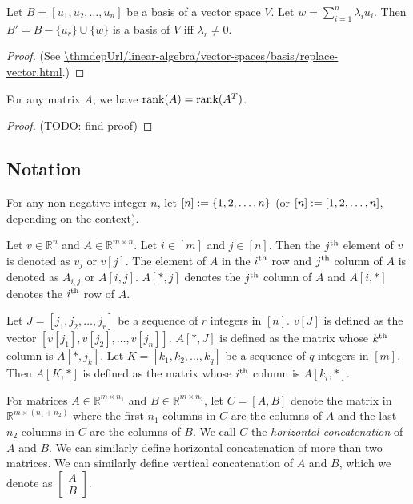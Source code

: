 \begin{lemma}
\label{thm:replace-vector-in-basis}
Let $B = [u_1, u_2, \ldots, u_n]$ be a basis of a vector space $V$.
Let $w = \sum_{i=1}^n \lambda_i u_i$.
Then $B' = B - \{u_r\} \cup \{w\}$ is a basis of $V$ iff $\lambda_r \neq 0$.
\end{lemma}
\begin{proof}
(See \url{\thmdepUrl/linear-algebra/vector-spaces/basis/replace-vector.html}.)
\end{proof}

\begin{lemma}
For any matrix $A$, we have $\operatorname{rank}(A) = \operatorname{rank}(A^T)$.
\end{lemma}
\begin{proof}
(TODO: find proof)
\end{proof}

\subsection{Notation}

For any non-negative integer $n$, let $[n] := \{1, 2, \ldots, n\}$
(or $[n] := [1, 2, \ldots, n]$, depending on the context).

Let $v \in \mathbb{R}^n$ and $A \in \mathbb{R}^{m \times n}$.
Let $i \in [m]$ and $j \in [n]$.
Then the $j^{\textrm{th}}$ element of $v$ is denoted as $v_j$ or $v[j]$.
The element of $A$ in the $i^{\textrm{th}}$ row and $j^{\textrm{th}}$ column of $A$ is denoted as
$A_{i,j}$ or $A[i,j]$. $A[*,j]$ denotes the $j^{\textrm{th}}$ column of $A$ and
$A[i, *]$ denotes the $i^{\textrm{th}}$ row of $A$.

Let $J = [j_1, j_2, \ldots, j_r]$ be a sequence of $r$ integers in $[n]$.
$v[J]$ is defined as the vector $[v[j_1], v[j_2], \ldots, v[j_n]]$.
$A[*,J]$ is defined as the matrix whose $k^{\textrm{th}}$ column is $A[*,j_k]$.
Let $K = [k_1, k_2, \ldots, k_q]$ be a sequence of $q$ integers in $[m]$.
Then $A[K,*]$ is defined as the matrix whose $i^{\textrm{th}}$ column is $A[k_i,*]$.

For matrices $A \in \mathbb{R}^{m \times n_1}$ and $B \in \mathbb{R}^{m \times n_2}$,
let $C = [A, B]$ denote the matrix in $\mathbb{R}^{m \times (n_1 + n_2)}$
where the first $n_1$ columns in $C$ are the columns of $A$
and the last $n_2$ columns in $C$ are the columns of $B$.
We call $C$ the \emph{horizontal concatenation} of $A$ and $B$.
We can similarly define horizontal concatenation of more than two matrices.
We can similarly define vertical concatenation of $A$ and $B$,
which we denote as $\begin{bmatrix}A\\B\end{bmatrix}$.

